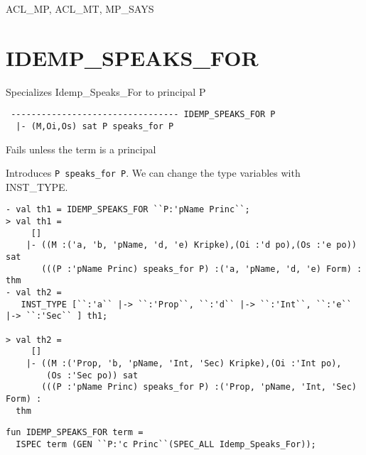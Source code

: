 \SEEALSO
ACL\_MP, ACL\_MT, MP\_SAYS
\ENDDOC

\section{IDEMP\_SPEAKS\_FOR}


\egroup

\SYNOPSIS
Specializes Idemp_Speaks_For to principal P

\DESCRIBE

\begin{verbatim}
 --------------------------------- IDEMP_SPEAKS_FOR P
  |- (M,Oi,Os) sat P speaks_for P
\end{verbatim}

\FAILURE
Fails unless the term is a principal

\EXAMPLE
Introduces \texttt{P speaks\_for P}. We can change the type variables with INST_TYPE.
\begin{holboxed}
  \begin{scriptsize}
\begin{verbatim}
- val th1 = IDEMP_SPEAKS_FOR ``P:'pName Princ``;
> val th1 =
     []
    |- ((M :('a, 'b, 'pName, 'd, 'e) Kripke),(Oi :'d po),(Os :'e po)) sat
       (((P :'pName Princ) speaks_for P) :('a, 'pName, 'd, 'e) Form) : thm
- val th2 = 
   INST_TYPE [``:'a`` |-> ``:'Prop``, ``:'d`` |-> ``:'Int``, ``:'e`` |-> ``:'Sec`` ] th1;

> val th2 =
     []
    |- ((M :('Prop, 'b, 'pName, 'Int, 'Sec) Kripke),(Oi :'Int po),
        (Os :'Sec po)) sat
       (((P :'pName Princ) speaks_for P) :('Prop, 'pName, 'Int, 'Sec) Form) :
  thm
\end{verbatim}
  \end{scriptsize}
\end{holboxed}

\IMPLEMENTATION
\begin{holboxed}
\begin{verbatim}
fun IDEMP_SPEAKS_FOR term = 
  ISPEC term (GEN ``P:'c Princ``(SPEC_ALL Idemp_Speaks_For));
\end{verbatim}
\end{holboxed}

